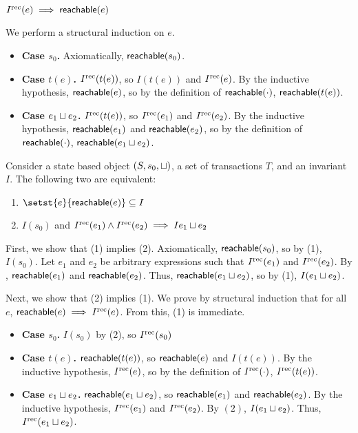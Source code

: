 \begin{claim}
  $I^{\text{rec}}(e) \implies \textsf{reachable}(e)$
\end{claim}
\begin{elidableproof}
  We perform a structural induction on $e$.
  \begin{itemize}
    \item \textbf{Case $s_0$.}
      Axiomatically, $\textsf{reachable}(s_0)$.

    \item \textbf{Case $t(e)$.}
      $I^{\text{rec}}(t(e))$, so $I(t(e))$ and $I^{\text{rec}}(e)$. By the inductive hypothesis,
      $\textsf{reachable}(e)$, so by the definition of $\textsf{reachable}(\cdot)$,
      $\textsf{reachable}(t(e))$.

    \item \textbf{Case $e_1 \sqcup e_2$.}
      $I^{\text{rec}}(t(e))$, so $I^{\text{rec}}(e_1)$ and $I^{\text{rec}}(e_2)$. By the inductive
      hypothesis, $\textsf{reachable}(e_1)$ and $\textsf{reachable}(e_2)$, so by the definition
      of $\textsf{reachable}(\cdot)$, $\textsf{reachable}(e_1 \sqcup e_2)$.
  \end{itemize}
\end{elidableproof}

\begin{claim}
  Consider a state based object $(S, s_0, \sqcup)$, a set of transactions $T$,
  and an invariant $I$. The following two are equivalent:
  \begin{enumerate}[\quad(1)]
    \item
      $\setst{e}{\reachable{e}} \subseteq I$

    \item
      $I(s_0)$ and $I^{\text{rec}}(e_1) \land I^{\text{rec}}(e_2) \implies I{e_1 \sqcup e_2}$
  \end{enumerate}
\end{claim}
\begin{elidableproof}
  First, we show that (1) implies (2). Axiomatically, $\textsf{reachable}(s_0)$, so by
  (1), $I(s_0)$. Let $e_1$ and $e_2$ be arbitrary expressions such that
  $I^{\text{rec}}(e_1)$ and $I^{\text{rec}}(e_2)$. By ,
  $\textsf{reachable}(e_1)$ and $\textsf{reachable}(e_2)$. Thus, $\textsf{reachable}(e_1 \sqcup e_2)$,
  so by (1), $I(e_1 \sqcup e_2)$.

  Next, we show that (2) implies (1). We prove by structural induction that for
  all $e$, $\textsf{reachable}(e) \implies I^{\text{rec}}(e)$. From this, (1) is immediate.
  \begin{itemize}
    \item \textbf{Case $s_0$.}
      $I(s_0)$ by (2), so $I^{\text{rec}}(s_0)$

    \item \textbf{Case $t(e)$.}
      $\textsf{reachable}(t(e))$, so $\textsf{reachable}(e)$ and $I(t(e))$. By the inductive
      hypothesis, $I^{\text{rec}}(e)$, so by the definition of $I^{\text{rec}}(\cdot)$,
      $I^{\text{rec}}(t(e))$.

    \item \textbf{Case $e_1 \sqcup e_2$.}
      $\textsf{reachable}(e_1 \sqcup e_2)$, so $\textsf{reachable}(e_1)$ and $\textsf{reachable}(e_2)$.
      By the inductive hypothesis, $I^{\text{rec}}(e_1)$ and $I^{\text{rec}}(e_2)$. By $(2)$,
      $I(e_1 \sqcup e_2)$. Thus, $I^{\text{rec}}(e_1 \sqcup e_2)$.
  \end{itemize}
\end{elidableproof}

